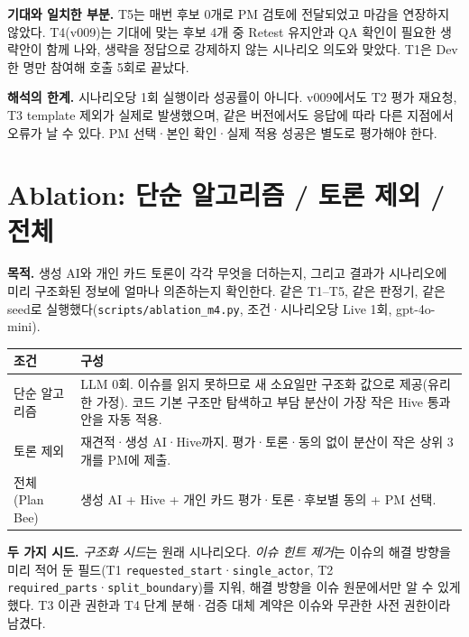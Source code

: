 \documentclass[11pt,a4paper]{article}
\begin{document}
\textbf{기대와 일치한 부분.} T5는 매번 후보 0개로 PM 검토에 전달되었고 마감을 연장하지 않았다. T4(v009)는 기대에 맞는 후보 4개 중 Retest 유지안과 QA 확인이 필요한 생략안이 함께 나와, 생략을 정답으로 강제하지 않는 시나리오 의도와 맞았다. T1은 Dev 한 명만 참여해 호출 5회로 끝났다.

\textbf{해석의 한계.} 시나리오당 1회 실행이라 성공률이 아니다. v009에서도 T2 평가 재요청, T3 template 제외가 실제로 발생했으며, 같은 버전에서도 응답에 따라 다른 지점에서 오류가 날 수 있다. PM 선택·본인 확인·실제 적용 성공은 별도로 평가해야 한다.

\newpage
\section{Ablation: 단순 알고리즘 / 토론 제외 / 전체}
\textbf{목적.} 생성 AI와 개인 카드 토론이 각각 무엇을 더하는지, 그리고 결과가 시나리오에 미리 구조화된 정보에 얼마나 의존하는지 확인한다. 같은 T1--T5, 같은 판정기, 같은 seed로 실행했다(\texttt{scripts/ablation\_m4.py}, 조건·시나리오당 Live 1회, gpt-4o-mini).

\begin{tabularx}{\linewidth}{@{}p{27mm}Y@{}}\toprule
조건 & 구성\\\midrule
단순 알고리즘 & LLM 0회. 이슈를 읽지 못하므로 새 소요일만 구조화 값으로 제공(유리한 가정). 코드 기본 구조만 탐색하고 부담 분산이 가장 작은 Hive 통과안을 자동 적용.\\
토론 제외 & 재견적·생성 AI·Hive까지. 평가·토론·동의 없이 분산이 작은 상위 3개를 PM에 제출.\\
전체 (Plan Bee) & 생성 AI + Hive + 개인 카드 평가·토론·후보별 동의 + PM 선택.\\\bottomrule
\end{tabularx}

\textbf{두 가지 시드.} \emph{구조화 시드}는 원래 시나리오다. \emph{이슈 힌트 제거}는 이슈의 해결 방향을 미리 적어 둔 필드(T1 \texttt{requested\_start}·\texttt{single\_actor}, T2 \texttt{required\_parts}·\texttt{split\_boundary})를 지워, 해결 방향을 이슈 원문에서만 알 수 있게 했다. T3 이관 권한과 T4 단계 분해·검증 대체 계약은 이슈와 무관한 사전 권한이라 남겼다.
\end{document}
